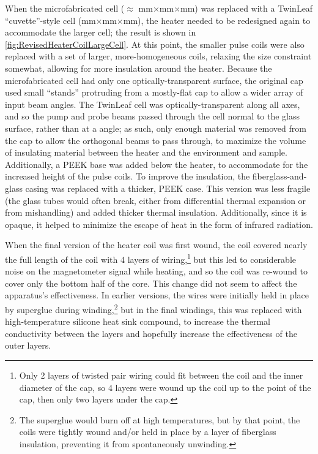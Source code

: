 \documentclass[PaulGanssle-Thesis.tex]{subfiles}
\begin{document}
When the microfabricated cell ($\approx$ \unit[7]{mm}$\times$\unit[4]{mm}$\times$\unit[2]{mm}) was replaced with a TwinLeaf ``cuvette''-style cell (\unit[7]{mm}$\times$\unit[7]{mm}$\times$\unit[12]{mm}), the heater needed to be redesigned again to accommodate the larger cell; the result is shown in \ref{fig:RevisedHeaterCoilLargeCell}. At this point, the smaller pulse coils were also replaced with a set of larger, more-homogeneous coils, relaxing the size constraint somewhat, allowing for more insulation around the heater. Because the microfabricated cell had only one optically-transparent surface, the original cap used small ``stands'' protruding from a mostly-flat cap to allow a wider array of input beam angles. The TwinLeaf cell was optically-transparent along all axes, and so the pump and probe beams passed through the cell normal to the glass surface, rather than at a \unit[45]{\degsym} angle; as such, only enough material was removed from the cap to allow the orthogonal beams to pass through, to maximize the volume of insulating material between the heater and the environment and sample. Additionally, a PEEK base was added below the heater, to accommodate for the increased height of the pulse coils. To improve the insulation, the fiberglass-and-glass casing was replaced with a thicker, PEEK case. This version was less fragile (the glass tubes would often break, either from differential thermal expansion or from mishandling) and added thicker thermal insulation. Additionally, since it is opaque, it helped to minimize the escape of heat in the form of infrared radiation. 

When the final version of the heater coil was first wound, the coil covered nearly the full length of the coil with 4 layers of wiring,\footnote{Only 2 layers of twisted pair wiring could fit between the coil and the inner diameter of the cap, so 4 layers were wound up the coil up to the point of the cap, then only two layers under the cap.} but this led to considerable noise on the magnetometer signal while heating, and so the coil was re-wound to cover only the bottom half of the core. This change did not seem to affect the apparatus's effectiveness. In earlier versions, the wires were initially held in place by superglue during winding,\footnote{The superglue would burn off at high temperatures, but by that point, the coils were tightly wound and/or held in place by a layer of fiberglass insulation, preventing it from spontaneously unwinding.} but in the final windings, this was replaced with high-temperature silicone heat sink compound, to increase the thermal conductivity between the layers and hopefully increase the effectiveness of the outer layers.
\end{document}
